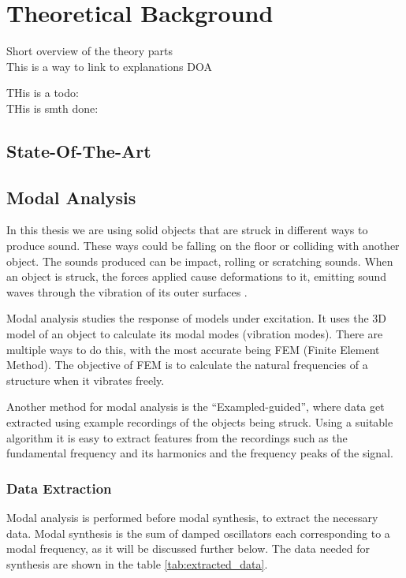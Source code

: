 \chapter{Theoretical Background}\label{ch:theory}
Short overview of the theory parts\\
This is a way to link to explanations \gls{DOA} 

THis is a todo: 
\\
THis is smth done:
\done{}

\section{State-Of-The-Art}\label{sec:state_art}


\section{Modal Analysis}\label{sec:modal_analysis}
In this thesis we are using solid objects that are struck in different ways to produce sound. These ways could be falling on the floor or colliding with another object. The sounds produced can be impact, rolling or scratching sounds. When an object is struck, the forces applied cause deformations to it, emitting sound waves through the vibration of its outer surfaces \cite{van2001foleyautomatic}.

Modal analysis studies the response of models under excitation. It uses the 3D model of an object to calculate its modal modes (vibration modes). There are multiple ways to do this, with the most accurate being FEM (Finite Element Method). The objective of FEM is to calculate the natural frequencies of a structure when it vibrates freely.

Another method for modal analysis is the ``Exampled-guided'', where data get extracted using example recordings of the objects being struck. Using a suitable algorithm it is easy to extract features from the recordings such as the fundamental frequency and its harmonics and the frequency peaks of the signal.

\subsection{Data Extraction}\label{sec:data_extract}
Modal analysis is performed before modal synthesis, to extract the necessary data. Modal synthesis is the sum of damped oscillators each corresponding to a modal frequency, as it will be discussed further below. The data needed for synthesis are shown in the table \ref{tab:extracted_data}.

